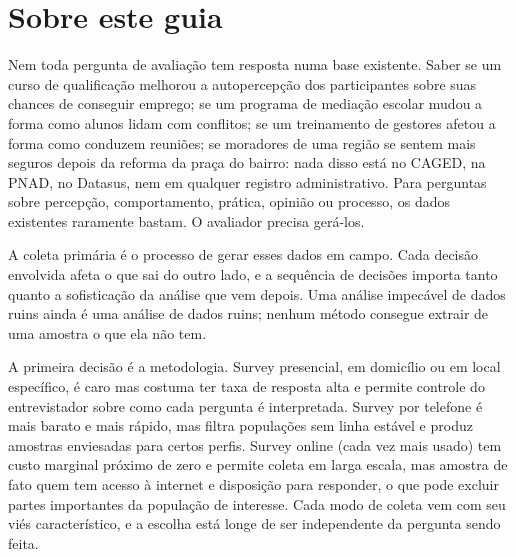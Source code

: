 \documentclass[12pt, a4paper, openany]{book}
\begin{document}
\vfill


\newpage

\thispagestyle{empty}
\section*{Sobre este guia}
Nem toda pergunta de avaliação tem resposta numa base existente. Saber
se um curso de qualificação melhorou a autopercepção dos participantes
sobre suas chances de conseguir emprego; se um programa de mediação
escolar mudou a forma como alunos lidam com conflitos; se um treinamento
de gestores afetou a forma como conduzem reuniões; se moradores de uma
região se sentem mais seguros depois da reforma da praça do bairro: nada
disso está no CAGED, na PNAD, no Datasus, nem em qualquer registro
administrativo. Para perguntas sobre percepção, comportamento, prática,
opinião ou processo, os dados existentes raramente bastam. O avaliador
precisa gerá-los.

A coleta primária é o processo de gerar esses dados em campo. Cada
decisão envolvida afeta o que sai do outro lado, e a sequência de
decisões importa tanto quanto a sofisticação da análise que vem depois.
Uma análise impecável de dados ruins ainda é uma análise de dados ruins;
nenhum método consegue extrair de uma amostra o que ela não tem.

A primeira decisão é a metodologia. Survey presencial, em domicílio ou em
local específico, é caro mas costuma ter taxa de resposta alta e permite
controle do entrevistador sobre como cada pergunta é interpretada. Survey
por telefone é mais barato e mais rápido, mas filtra populações sem linha
estável e produz amostras enviesadas para certos perfis. Survey online
(cada vez mais usado) tem custo marginal próximo de zero e permite coleta
em larga escala, mas amostra de fato quem tem acesso à internet e
disposição para responder, o que pode excluir partes importantes da
população de interesse. Cada modo de coleta vem com seu viés
característico, e a escolha está longe de ser independente da pergunta
sendo feita.
\end{document}
